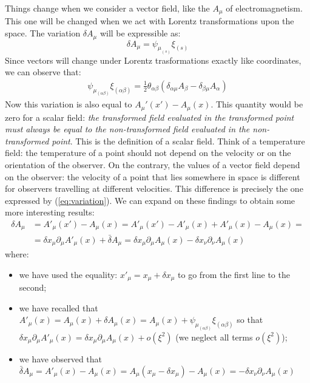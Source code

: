 \documentclass[class=article]{standalone}
\begin{document}
Things change when we consider a vector field, like the $A_{\mu}$ of electromagnetism. This one will be changed when we act with Lorentz transformations upon the space. The variation $\delta A_{\mu}$ will be expressible as: 
\begin{equation}
\delta A_{\mu}=\psi_{\mu_{(s)}}\xi_{(s)}
\label{eq:variation}
\end{equation}
Since vectors will change under Lorentz trasformations exactly like coordinates, we can observe that:
\begin{align*}
\psi_{\mu_{(\alpha\beta)}}\xi_{(\alpha\beta)}=\frac{1}{2}\theta_{\alpha\beta}(\delta_{\alpha\mu}A_{\beta}-\delta_{\beta\mu}A_{\alpha})
\end{align*}
Now this variation is also equal to $A_{\mu}'(x')-A_{\mu}(x)$. This quantity would be zero for a scalar field: \textit{the transformed field evaluated in the transformed point must always be equal to the non-transformed field evaluated in the non-transformed point}. This is the definition of a scalar field. Think of a temperature field: the temperature of a point should not depend on the velocity or on the orientation of the observer.
On the contrary, the values of a vector field depend on the observer: the velocity of a point that lies somewhere in space is different for observers travelling at different velocities. This difference is precisely the one expressed by (\ref{eq:variation}). We can expand on these findings to obtain some more interesting results:
\begin{align*}
\delta A_{\mu}&=A'_{\mu}(x')-A_{\mu}(x)=A'_{\mu}(x')-A'_{\mu}(x)+A'_{\mu}(x)-A_{\mu}(x)=\\
&=\delta x_{\mu}\partial_{\mu}A'_{\mu}(x)+\bar{\delta}A_{\mu}=\delta x_{\mu}\partial_{\mu}A_{\mu}(x)-\delta x_{\nu}\partial_{\nu}A_{\mu}(x)
\end{align*}
where:
\begin{itemize}
\item we have used the equality: $x'_{\mu}=x_{\mu}+\delta x_{\mu}$ to go from the first line to the second;
\item we have recalled that $A'_{\mu}(x)=A_{\mu}(x)+\delta A_{\mu}(x)=A_{\mu}(x)+\psi_{\mu_{(\alpha\beta)}}\xi_{(\alpha\beta)}$ so that $\delta x_{\mu}\partial_{\mu}A'_{\mu}(x)=\delta x_{\mu}\partial_{\mu}A_{\mu}(x)+o(\xi^2)$ (we neglect all terms $o(\xi^2)$);
\item we have observed that $\bar{\delta}A_{\mu}=A'_{\mu}(x)-A_{\mu}(x)=A_{\mu}(x_{\mu}-\delta x_{\mu})-A_{\mu}(x)=-\delta x_{\nu}\partial_{\nu}A_{\mu}(x)$
\end{itemize}
\end{document}
